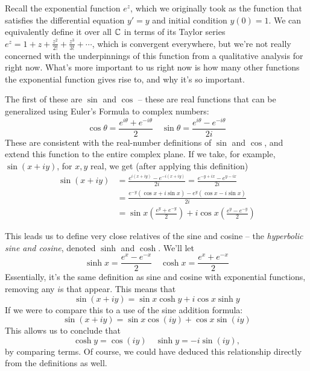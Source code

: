 Recall the exponential function $e^z$, which we originally took as the function that satisfies the differential equation $y' = y$ and initial condition $y(0) = 1$. We can equivalently define it over all $\mathbb C$ in terms of its Taylor series $e^z = 1 + z + \frac{z^2}{2!}  + \frac{z^3}{3!} + \cdots$, which is convergent everywhere, but we're not really concerned with the underpinnings of this function from a qualitative analysis for right now. What's more important to us right now is how many other functions the exponential function gives rise to, and why it's so important.

The first of these are $\sin$ and $\cos$ -- these are real functions that can be generalized using Euler's Formula to complex numbers:
\[
    \cos \theta = \frac{e^{i\theta} + e^{-i\theta}}{2} \quad \sin \theta = \frac{e^{i\theta} - e^{-i\theta}}{2i}
\]
These are consistent with the real-number definitions of $\sin$ and $\cos$, and extend this function to the entire complex plane. If we take, for example, $\sin(x+iy)$, for $x, y$ real, we get (after applying this definition)
\begin{align*}
    \sin (x+iy) & = \frac{e^{i(x+iy)}- e^{-i(x+iy)}}{2i} = \frac{e^{-y + ix}- e^{y - ix}}{2i}                     \\
                & = \frac{e^{-y}(\cos x + i \sin x) - e^{y}(\cos x - i \sin x)}{2i}                               \\
                & = \sin x \left(\frac{e^y + e^{-y}}{2} \right) + i \cos x \left(\frac{e^{y} - e^{-y}}{2} \right)
\end{align*}

This leads us to define very close relatives of the sine and cosine -- the \textit{hyperbolic sine and cosine}, denoted $\sinh$ and $\cosh$. We'll let
\[
    \sinh x = \frac{e^{x} - e^{-x}}{2} \quad \cosh x = \frac{e^x + e^{-x}}{2}
\]
Essentially, it's the same definition as sine and cosine with exponential functions, removing any $i$s that appear. This means that
\[
    \sin(x +iy) = \sin x \cosh y + i \cos x \sinh y
\]
If we were to compare this to a use of the sine addition formula:
\[
    \sin(x + iy) = \sin x \cos(iy) + \cos x \sin(iy)
\]
This allows us to conclude that
\[
    \cosh y = \cos (iy) \quad \sinh y = -i \sin(iy),
\]
by comparing terms. Of course, we could have deduced this relationship directly from the definitions as well.

